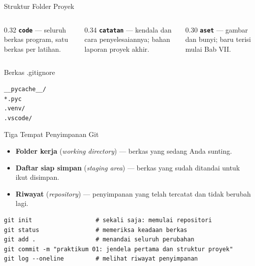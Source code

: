 \documentclass[aspectratio=169,10pt]{beamer}
\begin{document}
\begin{frame}{Struktur Folder Proyek}
\centering
{}
\vspace{0.10cm}
\begin{columns}[T,onlytextwidth]
  \begin{column}{0.32\textwidth}
    {\scriptsize\textbf{\texttt{code}} --- seluruh berkas program, satu berkas
     per latihan.}
  \end{column}
  \begin{column}{0.34\textwidth}
    {\scriptsize\textbf{\texttt{catatan}} --- kendala dan cara penyelesaiannya;
     bahan laporan proyek akhir.}
  \end{column}
  \begin{column}{0.30\textwidth}
    {\scriptsize\textbf{\texttt{aset}} --- gambar dan bunyi; baru terisi mulai
     Bab VII.}
  \end{column}
\end{columns}
\end{frame}

\begin{frame}[fragile]{Berkas .gitignore}
\begin{lstlisting}
__pycache__/
*.pyc
.venv/
.vscode/
\end{lstlisting}
\end{frame}

\begin{frame}[fragile]{Tiga Tempat Penyimpanan Git}
\begin{itemize}
  \item \textbf{Folder kerja} (\emph{working directory}) --- berkas yang sedang
        Anda sunting.
  \item \textbf{Daftar siap simpan} (\emph{staging area}) --- berkas yang sudah
        ditandai untuk ikut disimpan.
  \item \textbf{Riwayat} (\emph{repository}) --- penyimpanan yang telah tercatat
        dan tidak berubah lagi.
\end{itemize}
\vspace{0.10cm}
\begin{lstlisting}
git init                  # sekali saja: memulai repositori
git status                # memeriksa keadaan berkas
git add .                 # menandai seluruh perubahan
git commit -m "praktikum 01: jendela pertama dan struktur proyek"
git log --oneline         # melihat riwayat penyimpanan
\end{lstlisting}
\end{frame}
\end{document}

